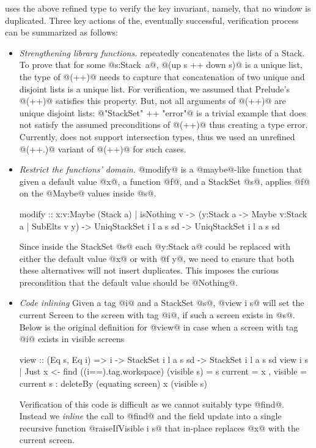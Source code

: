 \toolname uses the above refined type to verify the key invariant,
namely, that no window is duplicated.
%
%
Three key actions of the, eventually successful, verification process
can be summarized as follows:
\begin{itemize}
\item\emph{Strengthening library functions.} 
  \lbxmonad repeatedly concatenates the lists of a Stack. %
  To prove that for some \hbox{@s:Stack a@,} @(up s ++ down s)@ is a unique list,
  the type of @(++)@ needs to capture that concatenation of two unique and
  disjoint lists is a unique list.
  For verification, we assumed that Prelude's @(++)@ satisfies this property.
  But, not all arguments of @(++)@ are unique disjoint lists:
  @"StackSet" ++ "error"@ is a trivial example that does not satisfy
  the assumed preconditions of @(++)@ thus creating a type error.
  Currently, \toolname does not support intersection types, 
  thus we used an unrefined @(++.)@ variant of @(++)@ for such cases.
     
\item\emph{Restrict the functions' domain.}
  @modify@ is a @maybe@-like function that given a default value @x@,
  a function @f@, and a StackSet @s@, applies @f@ on the @Maybe@
  values inside @s@. 
\begin{code}
modify :: x:{v:Maybe (Stack a) | isNothing v}
       -> (y:Stack a -> Maybe {v:Stack a | SubElts v y})
       -> UniqStackSet i l a s sd 
       -> UniqStackSet i l a s sd
\end{code}
        Since inside the StackSet @s@ each @y:Stack a@ could be replaced
    with either the default value @x@ or with @f y@, we need to
    ensure that both these alternatives will not insert duplicates.
	This imposes the curious precondition that the default
	value should be @Nothing@.

			
	\item\emph{Code inlining}
    Given a tag @i@ and a StackSet @s@,  @view i s@ will set the current Screen 
    to the screen with tag @i@, if such a screen exists in @s@.
    Below is the original definition for @view@ in case when a screen with tag 
    @i@ exists in visible screens
\begin{code}
view :: (Eq s, Eq i) => i 
     -> StackSet i l a s sd 
     -> StackSet i l a s sd
view i s    
  | Just x <- find ((i==).tag.workspace) (visible s)
  = s { current = x
      , visible = current s 
                : deleteBy (equating screen) x (visible s) } 
\end{code}
    Verification of this code is difficult as we cannot suitably type @find@. 
    Instead we \emph{inline} the call to @find@ and the field update into a 
    single recursive function @raiseIfVisible i s@ that in-place replaces @x@ 
    with the current screen.  
\end{itemize}

